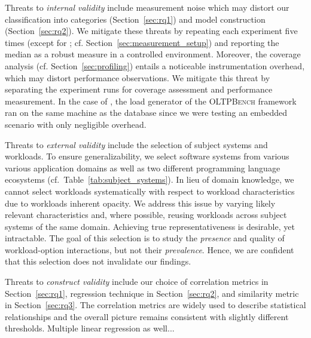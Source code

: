 Threats to \textit{internal validity} include measurement noise which may distort our classification into categories (Section~\ref{sec:rq1}) and model construction (Section~\ref{sec:rq2}). We mitigate these threats by repeating each experiment five times  (except for \htwo; cf. Section~\ref{sec:measurement_setup}) and reporting the median as a robust measure in a controlled environment. Moreover, the coverage analysis (cf. Section~\ref{sec:profiling}) entails a noticeable instrumentation overhead, which may distort performance observations. We mitigate this threat by separating the experiment runs for coverage assessment and performance measurement. In the case of \htwo, the load generator of the \textsc{OLTPBench} framework~\cite{difallah_oltp_2013} ran on the same machine as the database since we were testing an embedded scenario with only negligible overhead. 	
	
Threats to\textit{ external validity} include the selection of subject systems and workloads. To ensure generalizability, we select software systems from various various application domains as well as two different programming language ecosystems (cf.~Table~\ref{tab:subject_systems}). In lieu of domain knowledge, we cannot select workloads systematically with respect to workload characteristics due to workloads inherent opacity. We address this issue by varying likely relevant characteristics and, where possible, reusing workloads across subject systems of the same domain. Achieving true representativeness is desirable, yet intractable. 
The goal of this selection is to study the \emph{presence} and quality of workload-option interactions, but not their \emph{prevalence}. Hence, we are confident that this selection does not invalidate our findings.

{\color{magenta}Threats to \textit{construct validity} include our choice of correlation metrics in Section~\ref{sec:rq1}, regression technique in Section~\ref{sec:rq2}, and similarity metric in Section~\ref{sec:rq3}. The correlation metrics are widely used to describe statistical relationships and the overall picture remains consistent with slightly different thresholds. Multiple linear regression as well... 
}
\color{black}
